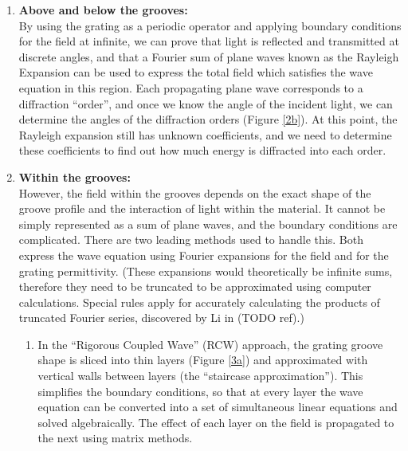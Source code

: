 \begin{enumerate}
\begin{itemize}
	\end{itemize}
\item \textbf{Above and below the grooves:}\\
By using the grating as a periodic operator and applying boundary conditions for the field at infinite, we can prove that light is reflected and transmitted at discrete angles, and that a Fourier sum of plane waves known as the Rayleigh Expansion can be used to express the total field which satisfies the wave equation in this region.  Each propagating plane wave corresponds to a diffraction ``order'', and once we know the angle of the incident light, we can determine the angles of the diffraction orders (Figure \ref{2b}).  At this point, the Rayleigh expansion still has unknown coefficients, and we need to determine these coefficients to find out how much energy is diffracted into each order.
\item \textbf{Within the grooves:}\\
However, the field within the grooves depends on the exact shape of the groove profile and the interaction of light within the material.  It cannot be simply represented as a sum of plane waves, and the boundary conditions are complicated.  There are two leading methods used to handle this.  Both express the wave equation using Fourier expansions for the field and for the grating permittivity.  (These expansions would theoretically be infinite sums, therefore they need to be truncated to be approximated using computer calculations.  Special rules apply for accurately calculating the products  of truncated Fourier series, discovered by Li in (TODO ref).)
\begin{enumerate} 
	\item In the ``Rigorous Coupled Wave'' (RCW) approach, the grating groove shape is sliced into thin layers (Figure \ref{3a}) and approximated with vertical walls between layers (the ``staircase approximation'').  This simplifies the boundary conditions, so that at every layer the wave equation can be converted into a set of simultaneous linear equations and solved algebraically.  The effect of each layer on the field is propagated to the next using matrix methods.
	

\end{enumerate}
\end{enumerate}
